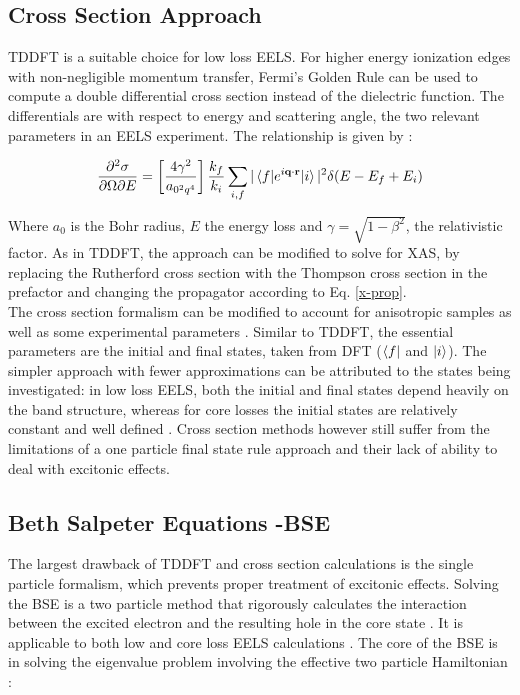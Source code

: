 \subsection{Cross Section Approach}
TDDFT is a suitable choice for low loss EELS.  For higher energy ionization edges with non-negligible momentum transfer, Fermi's Golden Rule can be used to compute a double differential cross section instead of the dielectric function.  The differentials are with respect to energy and scattering angle, the two relevant parameters in an EELS experiment.  The relationship is given by \cite{hebert_practical_2007}:

\begin{equation}
		\frac{\partial^2 \sigma}{\partial \Omega \partial E} = \left[\frac{4\gamma^2}{a_{\mathrm{0}^2q^4}}\right] \frac{k_f}{k_i} \sum_{i,f}|\mel{f}{e^{i\textbf{q}\cdot\textbf{r}}}{i}|^2\delta(E-E_f+E_i)
		\label{telnes_eq}
\end{equation}

Where $a_0$ is the Bohr radius, $E$ the energy loss and $\gamma = \sqrt{1- \beta^2}$, the relativistic factor.  As in TDDFT, the approach can be modified to solve for XAS, by replacing the Rutherford cross section with the Thompson cross section in the prefactor and changing the propagator according to Eq. \ref{x-prop}.\\



The cross section formalism can be modified to account for anisotropic samples as well as some experimental parameters \cite{hebert_practical_2007}. Similar to TDDFT, the essential parameters are the initial and final states, taken from DFT ($\bra{f}$ and $\ket{i}$).  The simpler approach with fewer approximations can be attributed to the states being investigated: in low loss EELS, both the initial and final states depend heavily on the band structure, whereas for core losses the initial states are relatively constant and well defined \cite{hebert_practical_2007}.  Cross section methods however still suffer from the limitations of a one particle final state rule approach and their lack of ability to deal with excitonic effects.  

\subsection{Beth Salpeter Equations -BSE}

The largest drawback of TDDFT and cross section calculations is the single particle formalism, which prevents proper treatment of excitonic effects. Solving the BSE is a two particle method that rigorously calculates the  interaction between the excited electron and the resulting hole in the core state \cite{salpeter_relativistic_1951}.  It is applicable to both low and core loss EELS calculations \cite{exciting}.  The core of the BSE is in solving the eigenvalue problem involving the effective two particle Hamiltonian \cite{draxl_bse_2009}: 



